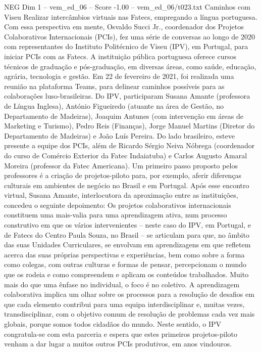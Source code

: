 \begin{textsample}{NEG Dim 1 – vem\_ed\_06 – Score -1.00 – vem\_ed\_06/t023.txt}  \label{ex:f1_neg_026}
Caminhos com Viseu Realizar intercâmbios virtuais nas Fatecs, empregando a língua portuguesa.
Com essa perspectiva em mente, Osvaldo Succi Jr., coordenador dos Projetos Colaborativos Internacionais (PCIs), fez uma série de conversas ao longo de 2020 com representantes do Instituto Politécnico de Viseu (IPV), em Portugal, para iniciar PCIs com as Fatecs.
A instituição pública portuguesa oferece cursos técnicos de graduação e pós-graduação, em diversas áreas, como saúde, educação, agrária, tecnologia e gestão.
Em 22 de fevereiro de 2021, foi realizada uma reunião na plataforma Teams, para delinear caminhos possíveis para as colaborações luso-brasileiras.
Do IPV, participaram Susana Amante (professora de Língua Inglesa), António Figueiredo (atuante na área de Gestão, no Departamento de Madeiras), Joaquim Antunes (com intervenção em áreas de Marketing e Turismo), Pedro Reis (Finanças), Jorge Manuel Martins (Diretor do Departamento de Madeiras) e João Luís Pereira.
Do lado brasileiro, esteve presente a equipe dos PCIs, além de Ricardo Sérgio Neiva Nóbrega (coordenador do curso de Comércio Exterior da Fatec Indaiatuba) e Carlos Augusto Amaral Moreira (professor da Fatec Americana).
Um primeiro passo proposto pelos professores é a criação de projetos-piloto para, por exemplo, aferir diferenças culturais em ambientes de negócio no Brasil e em Portugal.
Após esse encontro virtual, Susana Amante, interlocutora da aproximação entre as instituições, concedeu o seguinte depoimento: Os projetos colaborativos internacionais constituem uma mais-valia para uma aprendizagem ativa, num processo construtivo em que os vários intervenientes – neste caso do IPV, em Portugal, e de Fatecs do Centro Paula Souza, no Brasil – se articulam para que, no âmbito das suas Unidades Curriculares, se envolvam em aprendizagens em que refletem acerca das suas próprias perspectivas e experiências, bem como sobre a forma como colegas, com outras culturas e formas de pensar, percepcionam o mundo que os rodeia e como compreendem e aplicam os conteúdos trabalhados.
Muito mais do que uma ênfase no individual, o foco é no coletivo.
A aprendizagem colaborativa implica um olhar sobre os processos para a resolução de desafios em que cada elemento contribui para uma equipa interdisciplinar e, muitas vezes, transdisciplinar, com o objetivo comum de resolução de problemas cada vez mais globais, porque somos todos cidadãos do mundo.
Neste sentido, o IPV congratula-se com esta parceria e espera que estes primeiros projetos-piloto venham a dar lugar a muitos outros PCIs produtivos, em anos vindouros.

\end{textsample}
